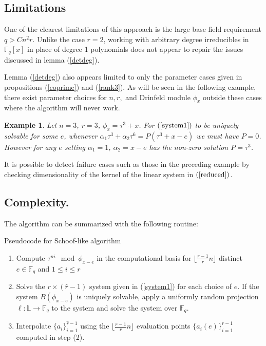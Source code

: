 \documentclass[sigconf]{acmart}
\newtheorem{example}{Example}
\newcommand{\F}{\mathbb{F}}
\renewcommand{\L}{\mathbb{L}}
\newcommand{\hatr}{\hat{r}}
\begin{document}
\subsection{Limitations}

One of the clearest limitations of this approach is the large base field requirement $q > Cn^2 r$. Unlike the case $r = 2$, working with arbitrary degree irreducibles in $\F_q[x]$ in place of degree 1 polynomials does not appear to repair the issues discussed in lemma (\ref{detdeg}).

Lemma (\ref{detdeg}) also appears limited to only the parameter cases given in propositions (\ref{coprime}) and (\ref{rank3}). As will be seen in the following example, there exist parameter choices for $n, r,$ and Drinfeld module $\phi_x$ outside these cases where the algorithm will never work.

\begin{example}\label{examplefail}
Let $n = 3$, $r =3$, $\phi_x = \tau^3 + x$. For $(\ref{system1})$ to be uniquely solvable for some $e$, whenever $\alpha_1 \tau^3 + \alpha_2 \tau^6 = P (\tau^3 + x - e)$ we must have $P = 0$. However for any $e$ setting $\alpha_1 = 1$, $\alpha_2 = x - e $ has the non-zero solution $P = \tau^3$.  
\end{example}

It is possible to detect failure cases such as those in the preceding example by checking dimensionality of the kernel of the linear system in $(\ref{reduced})$.  



\subsection{Complexity.}

The algorithm can be summarized with the following routine:

\begin{algorithm}[H]\label{schoof}
\caption{Pseudocode for Schoof-like algorithm}
\begin{enumerate}
    \item Compute $\tau^{ni} \mod \phi_{x-e}$ in the computational basis for $\lfloor\frac{r-1}{r}n \rfloor$ distinct $e \in \F_q$ and $1 \leq i \leq r$
    \item Solve the $r \times (\hatr-1)$ system given in (\ref{system1}) for each choice of $e$. If the system $B(\phi_{x-e})$ is uniquely solvable, apply a uniformly random projection $\ell : \L \to \F_q$ to the system and solve the system over $\F_q$.
    \item Interpolate $\{a_i\}_{i=1}^{\hatr-1}$ using the $\lfloor\frac{r-1}{r}n \rfloor$ evaluation points $\{a_i(e)\}_{i=1}^{r-1}$ computed in step (2). 
    \end{enumerate}
\end{algorithm}
\end{document}
